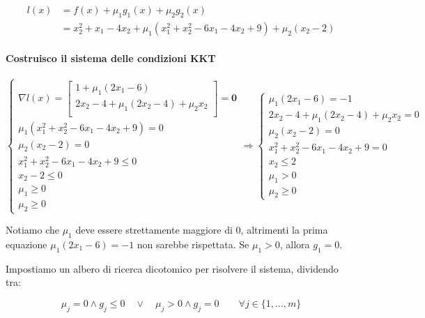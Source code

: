 \documentclass[\main/main.tex]{subfiles}
\begin{document}
\begin{align*}
	l(x) & = f(x) + \mu_1 g_1(x) + \mu_2 g_2(x)                               \\
	     & = x^2_2+x_1-4x_2 + \mu_1 (x^2_1+x^2_2-6x_1-4x_2+9) + \mu_2 (x_2-2)
\end{align*}

\paragraph*{Costruisco il sistema delle condizioni KKT}

\[
	\begin{cases}
		\nabla l(x) = \begin{bmatrix}
			1 + \mu_1(2x_1 - 6)                   \\
			2x_2 -4 + \mu_1(2x_2 - 4) + \mu_2 x_2 \\
		\end{bmatrix}
		= \bm{0}                            \\
		\mu_1 (x^2_1+x^2_2-6x_1-4x_2+9) = 0 \\
		\mu_2 (x_2-2) = 0                   \\
		x^2_1+x^2_2-6x_1-4x_2+9 \leq 0      \\
		x_2-2 \leq 0                        \\
		\mu_1 \geq 0                        \\
		\mu_2 \geq 0
	\end{cases}
	\Rightarrow
	\begin{cases}
		\mu_1(2x_1 - 6) = -1                      \\
		2x_2 -4 + \mu_1(2x_2 - 4) + \mu_2 x_2 = 0 \\
		\mu_2 (x_2-2) = 0                         \\
		x^2_1+x^2_2-6x_1-4x_2+9 = 0               \\
		x_2 \leq 2                                \\
		\mu_1 > 0                                 \\
		\mu_2 \geq 0
	\end{cases}
\]

Notiamo che $\mu_1$ deve essere strettamente maggiore di 0, altrimenti la prima equazione $\mu_1(2x_1 - 6) = -1$ non sarebbe rispettata. Se $\mu_1 > 0$, allora $g_1 = 0$.

Impostiamo un albero di ricerca dicotomico per risolvere il sistema, dividendo tra:

\[
	\mu_j = 0 \land g_j \leq 0 \quad \lor \quad \mu_j > 0 \land g_j = 0 \qquad \forall j \in \{1, \ldots, m\}
\]
\end{document}
